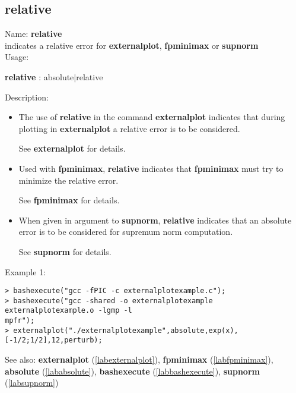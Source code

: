 \subsection{relative}
\label{labrelative}
\noindent Name: \textbf{relative}\\
indicates a relative error for \textbf{externalplot}, \textbf{fpminimax} or \textbf{supnorm}\\
\noindent Usage: 
\begin{center}
\textbf{relative} : \textsf{absolute$|$relative}\\
\end{center}
\noindent Description: \begin{itemize}

\item The use of \textbf{relative} in the command \textbf{externalplot} indicates that during
   plotting in \textbf{externalplot} a relative error is to be considered.
    
   See \textbf{externalplot} for details.

\item Used with \textbf{fpminimax}, \textbf{relative} indicates that \textbf{fpminimax} must try to minimize
   the relative error.
    
   See \textbf{fpminimax} for details.

\item When given in argument to \textbf{supnorm}, \textbf{relative} indicates that an absolute error
   is to be considered for supremum norm computation.
    
   See \textbf{supnorm} for details.
\end{itemize}
\noindent Example 1: 
\begin{center}\begin{minipage}{15cm}\begin{Verbatim}[frame=single]
> bashexecute("gcc -fPIC -c externalplotexample.c");
> bashexecute("gcc -shared -o externalplotexample externalplotexample.o -lgmp -l
mpfr");
> externalplot("./externalplotexample",absolute,exp(x),[-1/2;1/2],12,perturb);
\end{Verbatim}
\end{minipage}\end{center}
See also: \textbf{externalplot} (\ref{labexternalplot}), \textbf{fpminimax} (\ref{labfpminimax}), \textbf{absolute} (\ref{lababsolute}), \textbf{bashexecute} (\ref{labbashexecute}), \textbf{supnorm} (\ref{labsupnorm})
